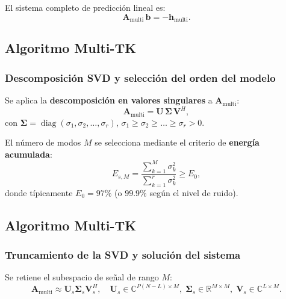 El sistema completo de predicción lineal es:
\begin{equation}
\boxed{\mathbf{A}_{\text{multi}}\,\mathbf{b} = -\mathbf{h}_{\text{multi}}}.
\label{eq:multi_equation}
\end{equation}


\subsection{Algoritmo Multi-TK}
\subsubsection{Descomposición SVD y selección del orden del modelo}

Se aplica la \textbf{descomposición en valores singulares} a $\mathbf{A}_{\text{multi}}$:
\begin{equation}
\mathbf{A}_{\text{multi}} = \mathbf{U}\,\boldsymbol{\Sigma}\,\mathbf{V}^H,
\label{eq:svd}
\end{equation}
con $\boldsymbol{\Sigma} = \operatorname{diag}(\sigma_1,\sigma_2,\dots,\sigma_r)$, $\sigma_1 \ge \sigma_2 \ge \dots \ge \sigma_r > 0$.

El número de modos $M$ se selecciona mediante el criterio de \textbf{energía acumulada}:
\begin{equation}
E_{s,M} = \frac{\displaystyle\sum_{k=1}^{M} \sigma_k^2}{\displaystyle\sum_{k=1}^{r} \sigma_k^2} \ge E_0,
\label{eq:energy}
\end{equation}
donde típicamente $E_0 = 97\%$ (o $99.9\%$ según el nivel de ruido).


\subsection{Algoritmo Multi-TK}
\subsubsection{Truncamiento de la SVD y solución del sistema}

Se retiene el subespacio de señal de rango $M$:
\begin{equation}
\mathbf{A}_{\text{multi}} \approx \mathbf{U}_s \boldsymbol{\Sigma}_s \mathbf{V}_s^H,
\quad
\mathbf{U}_s \in \mathbb{C}^{P(N-L)\times M},\;
\boldsymbol{\Sigma}_s \in \mathbb{R}^{M\times M},\;
\mathbf{V}_s \in \mathbb{C}^{L\times M}.
\label{eq:truncsvd}
\end{equation}

